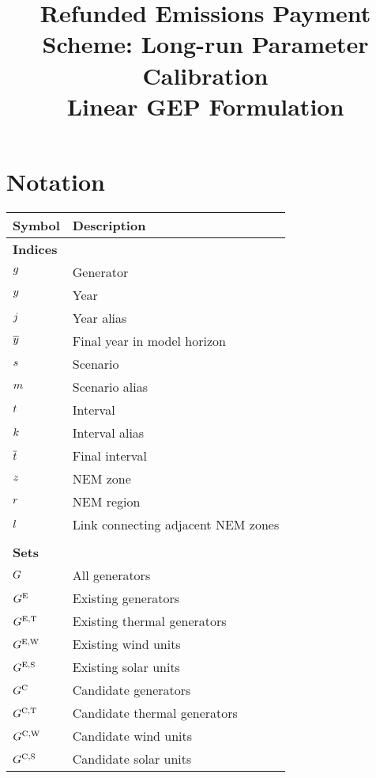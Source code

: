 \documentclass{article}
\title{Refunded Emissions Payment Scheme: Long-run Parameter Calibration\\Linear GEP Formulation}
\begin{document}
	\maketitle
	
	\section{Notation}
	\renewcommand*{\arraystretch}{1.3}
	\begin{longtable}{ p{}  p{}}
		\textbf{Symbol} & \textbf{Description}\\
		\hline\hline
		\multicolumn{2}{l}{\textbf{Indices}}\\
		$g$ & Generator\\ 
		$y$ & Year\\
		$j$ & Year alias\\
		$\overline{y}$ & Final year in model horizon\\
		$s$ & Scenario\\
		$m$ & Scenario alias\\
		$t$ & Interval\\
		$k$ & Interval alias\\
		$\overline{t}$ & Final interval\\
		$z$ & NEM zone\\
		$r$ & NEM region\\
		$l$ & Link connecting adjacent NEM zones\\
		& \\
		\multicolumn{2}{l}{\textbf{Sets}}\\
		$G$ & All generators\\
		$G^{\mathrm{E}}$ & Existing generators\\
		$G^{\mathrm{E,T}}$ & Existing thermal generators\\
		$G^{\mathrm{E,W}}$ & Existing wind units\\
		$G^{\mathrm{E,S}}$ & Existing solar units\\
		$G^{\mathrm{C}}$ & Candidate generators\\
		$G^{\mathrm{C,T}}$ & Candidate thermal generators\\
		$G^{\mathrm{C,W}}$ & Candidate wind units\\
		$G^{\mathrm{C,S}}$ & Candidate solar units\\

\end{longtable}
\end{document}
